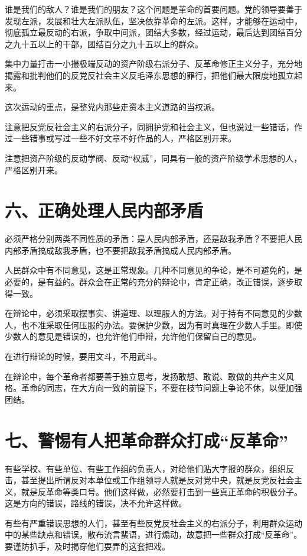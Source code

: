 谁是我们的敌人？谁是我们的朋友？这个问题是革命的首要问题。党的领导要善于发现左派，发展和壮大左派队伍，坚决依靠革命的左派。这样，才能够在运动中，彻底孤立最反动的右派，争取中间派，团结大多数，经过运动，最后达到团结百分之九十五以上的干部，团结百分之九十五以上的群众。

集中力量打击一小撮极端反动的资产阶级右派分子、反革命修正主义分子，充分地揭露和批判他们的反党反社会主义反毛泽东思想的罪行，把他们最大限度地孤立起来。

这次运动的重点，是整党内那些走资本主义道路的当权派。

注意把反党反社会主义的右派分子，同拥护党和社会主义，但也说过一些错话，作过一些错事或写过一些不好文章不好作品的人，严格区别开来。

注意把资产阶级的反动学阀、反动“权威”，同具有一般的资产阶级学术思想的人，严格区别开来。

\section{六、正确处理人民内部矛盾}

必须严格分别两类不同性质的矛盾：是人民内部矛盾，还是敌我矛盾？不要把人民内部矛盾搞成敌我矛盾，也不要把敌我矛盾搞成人民内部矛盾。

人民群众中有不同意见，这是正常现象。几种不同意见的争论，是不可避免的，是必要的，是有益的。群众会在正常的充分的辩论中，肯定正确，改正错误，逐步取得一致。

在辩论中，必须采取摆事实、讲道理、以理服人的方法。对于持有不同意见的少数人，也不准采取任何压服的办法。要保护少数，因为有时真理在少数人手里。即使少数人的意见是错误的，也允许他们申辩，允许他们保留自己的意见。

在进行辩论的时候，要用文斗，不用武斗。

在辩论中，每个革命者都要善于独立思考，发扬敢想、敢说、敢做的共产主义风格。革命的同志，在大方向一致的前提下，不要在枝节问题上争论不休，以便加强团结。

\section{七、警惕有人把革命群众打成“反革命”}

有些学校、有些单位、有些工作组的负责人，对给他们贴大字报的群众，组织反击，甚至提出所谓反对本单位或工作组领导人就是反对党中央，就是反党反社会主义，就是反革命等类口号。他们这样做，必然要打击到一些真正革命的积极分子。这是方向的错误，路线的错误，决不允许这样做。

有些有严重错误思想的人们，甚至有些反党反社会主义的右派分子，利用群众运动中的某些缺点和错误，散布流言蜚语，进行煽动，故意把一些群众打成“反革命”。要谨防扒手，及时揭穿他们耍弄的这套把戏。

